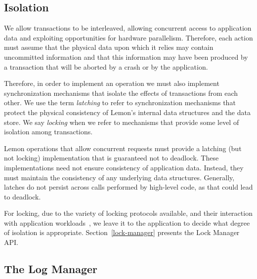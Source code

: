 \documentclass[letterpaper,twocolumn,english]{article}
\newcommand{\yad}{Lemon\xspace}
\begin{document}
\subsection{Isolation}
\label{Isolation}

We allow transactions to be interleaved, allowing concurrent access to
application data and exploiting opportunities for hardware
parallelism.  Therefore, each action must assume that the
physical data upon which it relies may contain uncommitted
information and that this information may have been produced by a
transaction that will be aborted by a crash or by the application.


Therefore, in order to implement an operation we must also implement
synchronization mechanisms that isolate the effects of transactions
from each other.  We use the term {\em latching} to refer to
synchronization mechanisms that protect the physical consistency of
\yad's internal data structures and the data store.  We say {\em
locking} when we refer to mechanisms that provide some level of
isolation among transactions.  

\yad operations that allow concurrent requests must provide a latching
(but not locking) implementation that is guaranteed not to deadlock.
These implementations need not ensure consistency of application data.
Instead, they must maintain the consistency of any underlying data
structures.  Generally, latches do not persist across calls performed
by high-level code, as that could lead to deadlock.

For locking, due to the variety of locking protocols available, and
their interaction with application
workloads~\cite{multipleGenericLocking}, we leave it to the
application to decide what degree of isolation is
appropriate. Section~\ref{lock-manager} presents the Lock Manager API.




\subsection{The Log Manager}
\label{log-manager}
\end{document}

